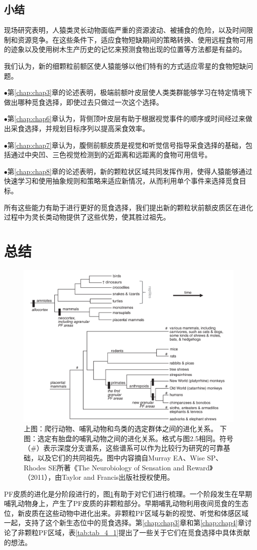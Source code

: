 \subsection{小结}
现场研究表明，人猿类灵长动物面临严重的资源波动、被捕食的危险，以及时间限制和资源竞争。在这些条件下，适应食物短缺期间的策略转换、使用远程食物可用的迹象以及使用树木生产历史的记忆来预测食物出现的位置等方法都是有益的。

我们认为，新的细颗粒前额区使人猿能够以他们特有的方式适应零星的食物短缺问题。\par
$\bullet$第\ref{chap:chap3}章的论述表明，极端前额叶皮层使人类类群能够学习在特定情境下做出哪种觅食选择，即使过去只做过一次这个选择。\par
$\bullet$第\ref{chap:chap6}章认为，背侧顶叶皮层有助于根据视觉事件的顺序或时间经过来做出采食选择，并规划目标序列以提高采食效率。\par
$\bullet$第\ref{chap:chap7}章认为，腹侧前额皮质是视觉和听觉信号指导采食选择的基础，包括通过中央凹、三色视觉检测到的近距离和远距离的食物可用信号。\par
$\bullet$第\ref{chap:chap8}章的论述表明，新的颗粒状区域共同发挥作用，使得人猿能够通过快速学习和使用抽象规则和策略来适应新情况，从而利用单个事件来选择觅食目标。

所有这些能力有助于进行更好的觅食选择，我们提出新的颗粒状前额皮质区在进化过程中为灵长类动物提供了这些优势，使其胜过祖先。

\section{总结}
\begin{figure}[!htb]
	\centering
	\includegraphics[width=0.8\linewidth]{image_pfc/Fig_2_8}
	\caption{上图：爬行动物、哺乳动物和鸟类的选定群体之间的进化关系。 下图：选定有胎盘的哺乳动物之间的进化关系。格式与图2.5相同。符号（\#）表示深度分支谱系，这些谱系可以作为比较行为研究的可靠基础，以及它们的共同祖先。图中内容摘自Murray EA、Wise SP、Rhodes SE所著《The Neurobiology of Sensation and Reward》（2011），由Taylor and Francis出版社授权使用。\label{fig:fig_2_8}}
\end{figure}
PF皮质的进化是分阶段进行的，图\ref{fig:fig_2_8}有助于对它们进行梳理。一个阶段发生在早期哺乳动物身上，产生了PF皮质的非颗粒部分。早期哺乳动物利用夜间觅食的生态位，新皮质在这些动物中进化出来。非颗粒PF区域与新的视觉、听觉和体感区域一起，支持了这个新生态位中的觅食选择。第\ref{chap:chap3}章和第\ref{chap:chap4}章讨论了非颗粒PF区域，表\ref{tab:tab_4_1}提出了一些关于它们在觅食选择中具体贡献的想法。

